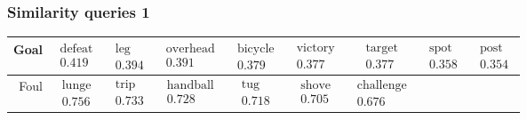 \documentclass{beamer}
\begin{document}
\begin{frame}
\frametitle{Similarity queries 1}
\tiny
\begin{tabular}{r|c c c c c c c c}
Goal
 & $\begin{matrix}\text{defeat}\\0.419\end{matrix}$
 & $\begin{matrix}\text{leg}\\0.394\end{matrix}$
 & $\begin{matrix}\text{overhead}\\0.391\end{matrix}$
 & $\begin{matrix}\text{bicycle}\\0.379\end{matrix}$
 & $\begin{matrix}\text{victory}\\0.377\end{matrix}$
  & $\begin{matrix}\text{target}\\0.377\end{matrix}$
 & $\begin{matrix}\text{spot}\\0.358\end{matrix}$
 & $\begin{matrix}\text{post}\\0.354\end{matrix}$
\\\hline
Foul
 & $\begin{matrix}\text{lunge}\\0.756\end{matrix}$
 & $\begin{matrix}\text{trip}\\0.733\end{matrix}$
 & $\begin{matrix}\text{handball}\\0.728\end{matrix}$
 & $\begin{matrix}\text{tug}\\0.718\end{matrix}$
 & $\begin{matrix}\text{shove}\\0.705\end{matrix}$
 & $\begin{matrix}\text{challenge}\\0.676\end{matrix}$

\end{tabular}
\end{frame}
\end{document}

